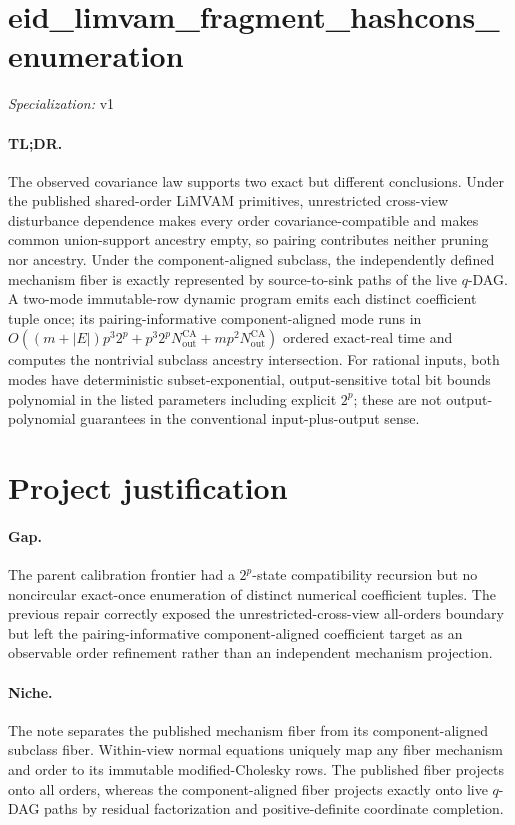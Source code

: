 \documentclass{article}
\begin{document}
\sloppy

\section*{eid\_\allowbreak{}limvam\_\allowbreak{}fragment\_\allowbreak{}hashcons\_\allowbreak{}enumeration}

\noindent\textit{Specialization:} v1\par

\paragraph{TL;DR.} The observed covariance law supports two exact but different conclusions. Under the published shared-order LiMVAM primitives, unrestricted cross-view disturbance dependence makes every order covariance-compatible and makes common union-support ancestry empty, so pairing contributes neither pruning nor ancestry. Under the component-aligned subclass, the independently defined mechanism fiber is exactly represented by source-to-sink paths of the live \(q\)-DAG. A two-mode immutable-row dynamic program emits each distinct coefficient tuple once; its pairing-informative component-aligned mode runs in \(O((m+|E|)p^3 2^p+p^3 2^pN_{\mathrm{out}}^{\mathrm{CA}}+mp^2N_{\mathrm{out}}^{\mathrm{CA}})\) ordered exact-real time and computes the nontrivial subclass ancestry intersection. For rational inputs, both modes have deterministic subset-exponential, output-sensitive total bit bounds polynomial in the listed parameters including explicit \(2^p\); these are not output-polynomial guarantees in the conventional input-plus-output sense.

\section{Project justification}

\paragraph{Gap.} The parent calibration frontier had a \(2^p\)-state compatibility recursion but no noncircular exact-once enumeration of distinct numerical coefficient tuples. The previous repair correctly exposed the unrestricted-cross-view all-orders boundary but left the pairing-informative component-aligned coefficient target as an observable order refinement rather than an independent mechanism projection.

\paragraph{Niche.} The note separates the published mechanism fiber from its component-aligned subclass fiber. Within-view normal equations uniquely map any fiber mechanism and order to its immutable modified-Cholesky rows. The published fiber projects onto all orders, whereas the component-aligned fiber projects exactly onto live \(q\)-DAG paths by residual factorization and positive-definite coordinate completion.
\end{document}
